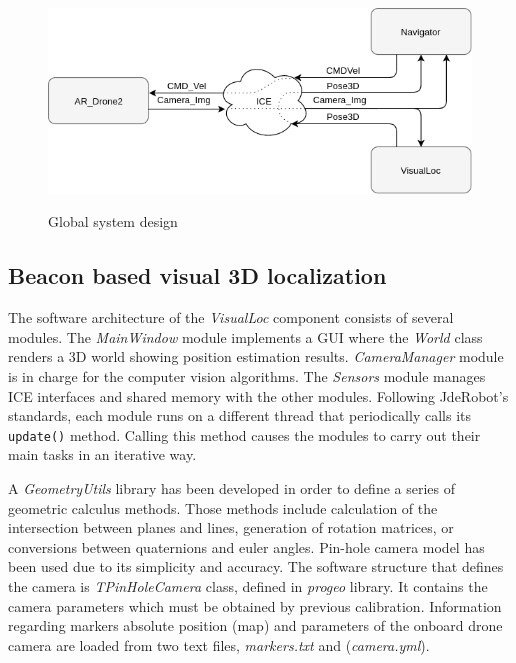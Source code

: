 \documentclass{styles/svproc}
\begin{document}
        \begin{figure}[h]
          \begin{center}
            {\includegraphics[width=\linewidth]{interactuacionproj.png}}
          \end{center}
          \caption{Global system design}
          \label{fig:design}
	\end{figure}
        
\subsection{Beacon based visual 3D localization}


	The software architecture of the \textit{VisualLoc} component consists of several modules. The \textit{MainWindow} module implements a GUI where the \textit{World} class renders a 3D world showing position estimation results. \textit{CameraManager} module is in charge for the computer vision algorithms. The \textit{Sensors} module manages ICE interfaces and shared memory with the other modules. Following JdeRobot's standards, each module runs on a different thread that periodically calls its \texttt{update()} method. Calling this method causes the modules to carry out their main tasks in an iterative way.
	
	A \textit{GeometryUtils} library has been developed in order to define a series of geometric calculus methods. Those methods include calculation of the intersection between planes and lines, generation of rotation matrices, or conversions between quaternions and euler angles. Pin-hole camera model has been used due to its simplicity and accuracy. The software structure that defines the camera is \textit{TPinHoleCamera} class, defined in \textit{progeo} library. %
It contains the camera parameters which must be obtained by previous calibration. Information regarding markers absolute position (map) and parameters of the onboard drone camera are loaded from two text files, \textit{markers.txt} and (\textit{camera.yml}).
	
\end{document}
